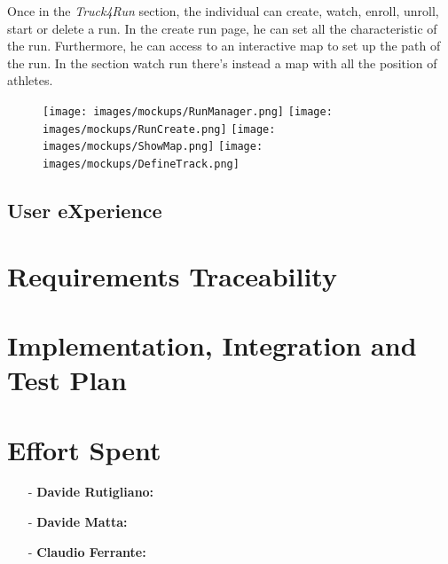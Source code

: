 \documentclass[a4paper]{article}
\begin{document}
        \newpage
Once in the \textit{Truck4Run} section, the individual can create, watch, enroll, unroll, start or delete a run.  In the create run page, he can set all the characteristic of the run. Furthermore, he can access to an interactive map to set up the path of the run. In the section watch run there's instead a map with all the position of athletes.

        \begin{figure}[!htpb]
    	\centering
    	\texttt{[image: images/mockups/RunManager.png]}
    	\texttt{[image: images/mockups/RunCreate.png]}
    	\texttt{[image: images/mockups/ShowMap.png]}
    	\texttt{[image: images/mockups/DefineTrack.png]}
        \end{figure}
     
\subsection{User eXperience}

\newpage
\section{Requirements Traceability}


\newpage
\section{Implementation, Integration and Test Plan}

\newpage
\section{Effort Spent}
    \begin{itemize}
        \item[-] \textbf{Davide Rutigliano: }
        
        \item[-] \textbf{Davide Matta: }
        
        \item[-] \textbf{Claudio Ferrante: }
    \end{itemize}
\end{document}
